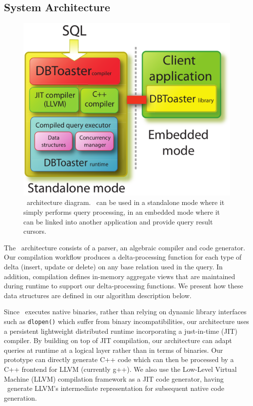   
\subsection{System Architecture}

\begin{figure}[t]
\begin{center}
\includegraphics[scale=0.45]{figures/overview}
\end{center}
\vspace{-4mm}
\caption{\compiler\ architecture diagram. \compiler\ can be used in a standalone
mode where it simply performs query processing, in an embedded mode where it can
be linked into another application and provide query result cursors.}
\label{fig:overview}
\end{figure}

The \compiler\ architecture consists of a parser, an algebraic compiler and
code generator. Our compilation workflow produces a delta-processing function
for each type of delta (insert, update or delete) on any base relation used in
the query. In addition, compilation defines in-memory aggregate views that are
maintained during runtime to support our delta-processing functions. We present
how these data structures are defined in our algorithm description below.

Since \compiler\ executes native binaries, rather than relying on dynamic library
interfaces such as \texttt{dlopen()} which suffer from binary incompatibilities,
our architecture uses a persistent lightweight distributed runtime incorporating
a just-in-time (JIT) compiler. By building on top of JIT compilation, our
architecture can adapt queries at runtime at a logical layer rather than in terms
of binaries. Our prototype can directly generate C++ code which can then be
processed by a C++ frontend for LLVM (currently g++). We also use the Low-Level
Virtual Machine (LLVM) compilation framework as a JIT code generator, having
\compiler\ generate LLVM's intermediate representation for subsequent native code
generation.

